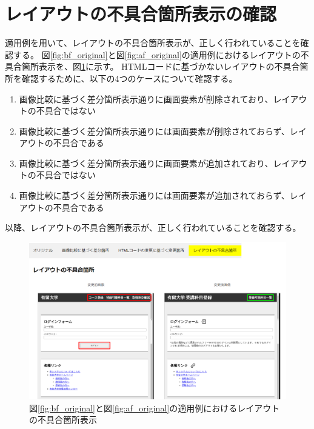 \section{レイアウトの不具合箇所表示の確認}
適用例を用いて、レイアウトの不具合箇所表示が、正しく行われていることを確認する。
図\ref{fig:bf_original}と図\ref{fig:af_original}の適用例におけるレイアウトの不具合箇所表示を、図\ref{fig: 5_app3}に示す。
HTMLコードに基づかないレイアウトの不具合箇所を確認するために、以下の4つのケースについて確認する。
\begin{enumerate}[label=ケース\arabic*., leftmargin=1.8cm]
    \setlength{\itemsep}{0pt}
          \setlength{\parsep}{0pt}
    \item 画像比較に基づく差分箇所表示通りに画面要素が削除されており、レイアウトの不具合ではない
    \item 画像比較に基づく差分箇所表示通りには画面要素が削除されておらず、レイアウトの不具合である
    \item 画像比較に基づく差分箇所表示通りに画面要素が追加されており、レイアウトの不具合ではない
    \item 画像比較に基づく差分箇所表示通りには画面要素が追加されておらず、レイアウトの不具合である
\end{enumerate}
以降、レイアウトの不具合箇所表示が、正しく行われていることを確認する。
\begin{figure}[tp]
    \begin{center}
        \includegraphics[width=1.0\columnwidth]{image/5/new_effect.png}
        \caption{図\ref{fig:bf_original}と図\ref{fig:af_original}の適用例におけるレイアウトの不具合箇所表示}
        \label{fig: 5_app3}
    \end{center}
\end{figure}

